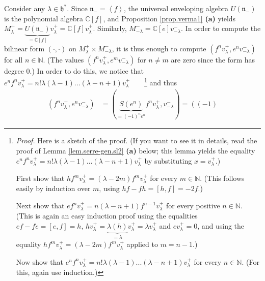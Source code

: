 \documentclass[etingof-lie.tex]{subfiles}
\begin{document}
\begin{example}
Consider any $\lambda\in\mathfrak{h}^{\ast}$. Since $\mathfrak{n}%
_{-}=\left\langle f\right\rangle $, the universal enveloping algebra $U\left(
\mathfrak{n}_{-}\right)  $ is the polynomial algebra $\mathbb{C}\left[
f\right]  $, and Proposition \ref{prop.verma1} \textbf{(a)} yields
$M_{\lambda}^{+}=\underbrace{U\left(  \mathfrak{n}_{-}\right)  }%
_{=\mathbb{C}\left[  f\right]  }v_{\lambda}^{+}=\mathbb{C}\left[  f\right]
v_{\lambda}^{+}$. Similarly, $M_{-\lambda}^{-}=\mathbb{C}\left[  e\right]
v_{-\lambda}^{-}$. In order to compute the bilinear form $\left(  \cdot
,\cdot\right)  $ on $M_{\lambda}^{+}\times M_{-\lambda}^{-}$, it is thus
enough to compute $\left(  f^{n}v_{\lambda}^{+},e^{n}v_{-\lambda}^{-}\right)
$ for all $n\in\mathbb{N}$. (The values $\left(  f^{n}v_{\lambda}^{+}%
,e^{m}v_{-\lambda}^{-}\right)  $ for $n\neq m$ are zero since the form has
degree $0$.) In order to do this, we notice that $e^{n}f^{n}v_{\lambda}%
^{+}=n!\lambda\left(  \lambda-1\right)  ...\left(  \lambda-n+1\right)
v_{\lambda}^{+}$\ \ \ \ \footnote{\textit{Proof.} Here is a sketch of the
proof. (If you want to see it in details, read the proof of Lemma
\ref{lem.serre-gen.sl2} \textbf{(a)} below; this lemma yields the equality
$e^{n}f^{n}v_{\lambda}^{+}=n!\lambda\left(  \lambda-1\right)  ...\left(
\lambda-n+1\right)  v_{\lambda}^{+}$ by substituting $x=v_{\lambda}^{+}$.)
\par
First show that $hf^{m}v_{\lambda}^{+}=\left(  \lambda-2m\right)
f^{m}v_{\lambda}^{+}$ for every $m\in\mathbb{N}$. (This follows easily by
induction over $m$, using $hf-fh=\left[  h,f\right]  =-2f$.)
\par
Next show that $ef^{n}v_{\lambda}^{+}=n\left(  \lambda-n+1\right)
f^{n-1}v_{\lambda}^{+}$ for every positive $n\in\mathbb{N}$. (This is again an
easy induction proof using the equalities $ef-fe=\left[  e,f\right]  =h$,
$hv_{\lambda}^{+}=\underbrace{\lambda\left(  h\right)  }_{=\lambda}v_{\lambda
}^{+}=\lambda v_{\lambda}^{+}$ and $ev_{\lambda}^{+}=0$, and using the
equality $hf^{m}v_{\lambda}^{+}=\left(  \lambda-2m\right)  f^{m}v_{\lambda
}^{+}$ applied to $m=n-1$.)
\par
Now show that $e^{n}f^{n}v_{\lambda}^{+}=n!\lambda\left(  \lambda-1\right)
...\left(  \lambda-n+1\right)  v_{\lambda}^{+}$ for every $n\in\mathbb{N}$.
(For this, again use induction.)} and thus%
\begin{align}
\left(  f^{n}v_{\lambda}^{+},e^{n}v_{-\lambda}^{-}\right)   &  =\left(
\underbrace{S\left(  e^{n}\right)  }_{=\left(  -1\right)  ^{n}e^{n}}%
f^{n}v_{\lambda}^{+},v_{-\lambda}^{-}\right)  =\left(  \left(  -1\right)

\end{align}
\end{example}
\end{document}
